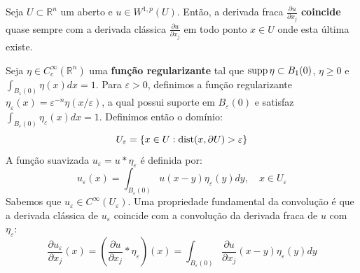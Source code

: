 \documentclass[cs_edp_2026.1.tex]{subfiles} %
\begin{document}
\begin{teorema}
	Seja $U \subset \mathbb{R}^n$ um aberto e $u \in W^{1,p}(U)$. Então, a derivada fraca $\tfrac{\partial u}{\partial x_j}$ \textbf{coincide} quase sempre com a derivada clássica $\tfrac{\partial u}{\partial x_j}$ em todo ponto $x \in U$ onde esta última existe.
\end{teorema}

\begin{prova}
	Seja $\eta \in C_c^\infty(\mathbb{R}^n)$ uma \textbf{função regularizante} tal que $\operatorname{supp} \eta \subset B_1(0)$, $\eta \ge 0$ e $\int_{B_1(0)} \eta(x) dx = 1$. Para $\varepsilon > 0$, definimos a função regularizante $\eta_\varepsilon(x) = \varepsilon^{-n} \eta(x/\varepsilon)$, a qual possui suporte em $B_\varepsilon(0)$ e satisfaz $\int_{B_\varepsilon(0)} \eta_\varepsilon(x) dx = 1$. Definimos então o domínio:
	$$U_\varepsilon = \{ x \in U : \operatorname{dist}(x, \partial U) > \varepsilon \}$$
	A função suavizada $u_\varepsilon = u * \eta_\varepsilon$ é definida por:
	$$u_\varepsilon(x) = \int_{B_\varepsilon(0)} u(x-y) \eta_\varepsilon(y) dy, \quad x \in U_\varepsilon$$
	Sabemos que $u_\varepsilon \in C^\infty(U_\varepsilon)$. Uma propriedade fundamental da convolução é que a derivada clássica de $u_\varepsilon$ coincide com a convolução da derivada fraca de $u$ com $\eta_\varepsilon$:
	$$\frac{\partial u_\varepsilon}{\partial x_j}(x) = \left( \frac{\partial u}{\partial x_j} * \eta_\varepsilon \right)(x) = \int_{B_\varepsilon(0)} \frac{\partial u}{\partial x_j}(x-y) \eta_\varepsilon(y) dy$$
	

\end{prova}
\end{document}

